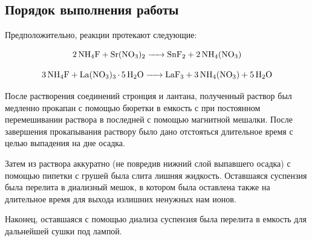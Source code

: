 \documentclass[a4paper, 12pt]{article}
\begin{document}
\subsection{Порядок выполнения работы}

Предположительно, реакции протекают следующие:

\begin{equation}
	\ce{2 NH4F + Sr(NO3)2 -> SnF2 + 2NH4(NO3)}
\end{equation}

\begin{equation}
	\ce{3 NH4F + La(NO3)3*5H2O -> LaF3 + 3NH4(NO3) + 5 H2O}
\end{equation}

После растворения соединений стронция и лантана, полученный раствор был медленно прокапан с помощью бюретки в емкость с  при постоянном перемешивании раствора в последней с помощью магнитной мешалки. После завершения прокапывания раствору было дано отстояться длительное время с целью выпадения на дне осадка. 

Затем из раствора аккуратно (не повредив нижний слой выпавшего осадка) с помощью пипетки с грушей была слита лишняя жидкость. Оставшаяся суспензия была перелита в диализный мешок, в котором была оставлена также на длительное время для выхода излишних ненужных нам ионов.

Наконец, оставшаяся с помощью диализа суспензия была перелита в емкость для дальнейшей сушки под лампой.
\end{document}
